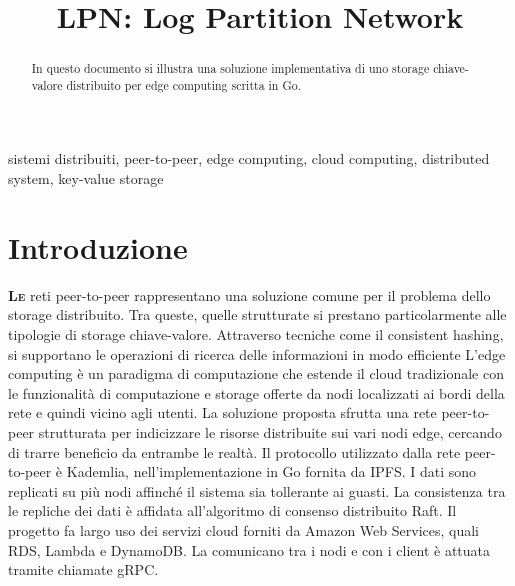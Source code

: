 \documentclass[conference]{IEEEtran}
\begin{document}
\title{LPN: Log Partition Network}

\author{
}


\maketitle

\begin{abstract}
In questo documento si illustra una soluzione implementativa di uno storage chiave-valore distribuito per edge computing scritta in Go.
\end{abstract}

\begin{IEEEkeywords}
sistemi distribuiti, peer-to-peer, edge computing, cloud computing, distributed system, key-value storage
\end{IEEEkeywords}

\section{Introduzione}
\lettrine{\textbf{L}}{\textbf{e}} reti peer-to-peer rappresentano una soluzione comune per il problema dello storage distribuito.
Tra queste, quelle strutturate si prestano particolarmente alle tipologie di storage chiave-valore.
Attraverso tecniche come il consistent hashing, si supportano le operazioni di ricerca delle informazioni in modo efficiente %
L'edge computing è un paradigma di computazione che estende il cloud tradizionale con le funzionalità di computazione e
storage offerte da nodi localizzati ai bordi della rete e quindi vicino agli utenti. La soluzione proposta sfrutta una
rete peer-to-peer strutturata per indicizzare le risorse distribuite sui vari nodi edge, cercando di trarre beneficio da entrambe le realtà.
Il protocollo utilizzato dalla rete peer-to-peer è Kademlia\cite{kademlia}, nell'implementazione in Go fornita da IPFS.
I dati sono replicati su più nodi affinché il sistema sia tollerante ai guasti.
La consistenza tra le repliche dei dati è affidata all'algoritmo di consenso distribuito Raft\cite{raft}\cite{raftGolang}.
Il progetto fa largo uso dei servizi cloud forniti da Amazon Web Services, quali RDS, Lambda e DynamoDB.
La comunicano tra i nodi e con i client è attuata tramite chiamate gRPC.
\end{document}
